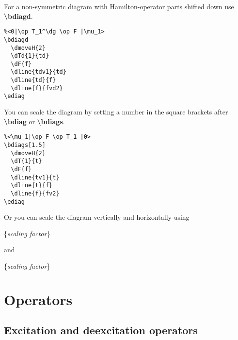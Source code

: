 \documentclass[a4paper]{article}
\newcommand{\myind}{\hspace{10pt}}
\begin{document}
For a non-symmetric diagram with Hamilton-operator parts shifted down use {\bf \textbackslash bdiagd}.

 \begin{minipage}[b]{0.55\linewidth}\centering
  \begin{lstlisting}
%<0|\op T_1^\dg \op F |\mu_1>
\bdiagd
  \dmoveH{2}
  \dTd{1}{td}
  \dF{f}
  \dline{tdv1}{td}
  \dline{td}{f}
  \dline{f}{fvd2}
\ediag
  \end{lstlisting}
 \end{minipage}
 \begin{minipage}[b]{0.45\linewidth}\centering
    \bdiagd
    \ediag
 \end{minipage}

You can scale the diagram by setting a number in the square brackets after {\bf \textbackslash bdiag}
or {\bf \textbackslash bdiags}.

 \begin{minipage}[b]{0.55\linewidth}\centering
  \begin{lstlisting}
%<\mu_1|\op F \op T_1 |0>
\bdiags[1.5]
  \dmoveH{2}
  \dT{1}{t}
  \dF{f}
  \dline{tv1}{t}
  \dline{t}{f}
  \dline{f}{fv2}
\ediag 
  \end{lstlisting}
 \end{minipage}
 \begin{minipage}[b]{0.45\linewidth}\centering
    \bdiags[1.5]
    \ediag
 \end{minipage}

Or you can scale the diagram vertically and horizontally using

\myind{\bf \textbackslash dvscale}\{{\it scaling factor}\}

and

\myind{\bf \textbackslash dhscale}\{{\it scaling factor}\}
 
\section{Operators}

\subsection{Excitation and deexcitation operators}
\end{document}
